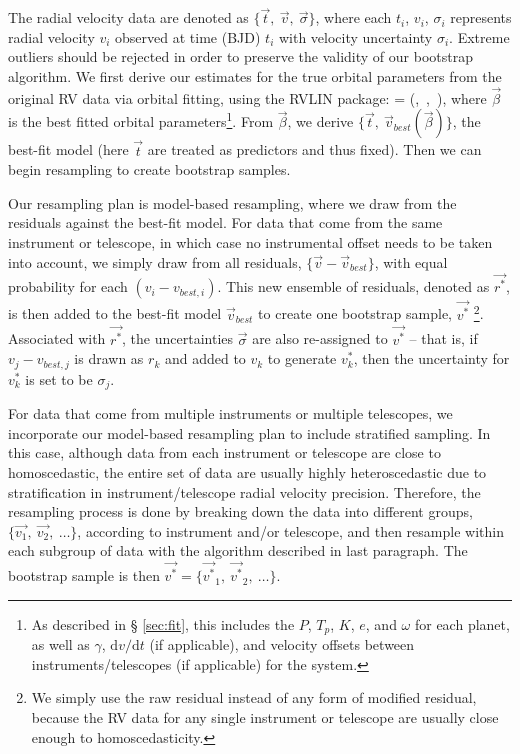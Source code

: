 The radial velocity data are denoted as $\lbrace \vec{t},\ \vec{v},\ \vec{\sigma}
\rbrace$, where each $t_i$, $v_i$, $\sigma_i$ represents radial
velocity $v_i$ observed at time (BJD) $t_i$ with velocity uncertainty
$\sigma_i$. Extreme outliers should be rejected in order to preserve the
validity of our bootstrap algorithm. We first derive our estimates for
the true orbital parameters from the original RV data via orbital fitting,
using the RVLIN package: \beq \vec{\beta}
= \mu(,\ ,\ \vec{\sigma}), \eeq where $\vec{\beta}$ is
the best fitted orbital parameters\footnote{As described in \S
  \ref{sec:fit}, this includes the $P$, $T_p$, $K$, $e$, and $\omega$
  for each planet, as well as $\gamma$, $\mbox{d}v/\mbox{d}t$ (if
  applicable), and velocity offsets between instruments/telescopes (if
  applicable) for the system.}. From $\vec{\beta}$, we derive $\lbrace
\vec{t},\ \vec{v}_{best}(\vec{\beta}) \rbrace$, the best-fit model
(here $\vec{t}$ are treated as predictors and thus fixed). Then we can
begin resampling to create bootstrap samples.

Our resampling plan is model-based resampling, where we draw from the
residuals against the best-fit model. For data that come from the
same instrument or telescope, in which case no instrumental offset
needs to be taken into account, we simply draw from all residuals,
$\lbrace \vec{v}-\vec{v}_{best} \rbrace$, with equal probability for
each $(v_i - v_{best,i})$. This new ensemble of residuals, denoted as
${\vec{r^*}}$, is then added to the best-fit model $\vec{v}_{best}$ to
create one bootstrap sample, $\vec{v^*}$ \footnote{We simply use the
  raw residual instead of any form of modified residual, because the
  RV data for any single instrument or telescope are usually close
  enough to homoscedasticity.}. Associated with ${\vec{r^*}}$, the
uncertainties $\vec{\sigma}$ are also re-assigned to $\vec{v^*}$ --
that is, if $v_j - v_{best,j}$ is drawn as $r_k$ and added to $v_k$ to
generate $v^*_k$, then the uncertainty for $v^*_k$ is set to be
$\sigma_j$.

For data that come from multiple instruments or multiple
telescopes, we incorporate our model-based resampling plan to include
stratified sampling. In this case, although data from each instrument
or telescope are close to homoscedastic, the entire set of data are
usually highly heteroscedastic due to stratification in
instrument/telescope radial velocity precision. Therefore, the
resampling process is done by breaking down the data into different
groups, $\lbrace \vec{v_1},\ \vec{v_2},\ \ldots \rbrace$, according to
instrument and/or telescope, and then resample within each
subgroup of data with the algorithm described in last paragraph. The bootstrap
sample is then $\vec{v^*} = \lbrace \vec{v^*}_1,\ \vec{v^*}_2,\ \ldots
\rbrace$.


